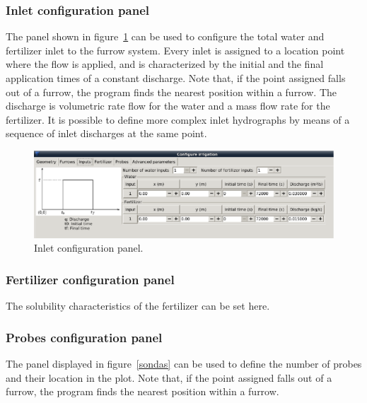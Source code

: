 \documentclass[review,authoryear]{elsarticle}
\begin{document}
\subsubsection{Inlet configuration panel}

The panel shown in figure~\ref{input} can be used to configure the total water
and fertilizer inlet to the furrow system. Every inlet is assigned to a location
point where the flow is applied, and is characterized by the initial and the
final application times of a constant discharge. Note that, if the point
assigned falls out of a furrow, the program finds the nearest position within a
furrow. The discharge is volumetric rate flow for the water and a mass flow rate
for the fertilizer. It is possible to define more complex inlet hydrographs by
means of a sequence of inlet discharges at the same point. 


\begin{figure}[!ht]
\begin{center}
\includegraphics[width=993\UNIT]{confInputEN-2.eps}
\caption{Inlet configuration panel.}\label{input}
\end{center}
\end{figure}

\subsubsection{Fertilizer configuration panel}

The solubility characteristics of the fertilizer can be set here. 

\subsubsection{Probes configuration panel}

The panel displayed in figure~\ref{sondas} can be used to define the number of
probes and their location in the plot. Note that, if the point assigned falls
out of a furrow, the program finds the nearest position within a furrow.
\end{document}
